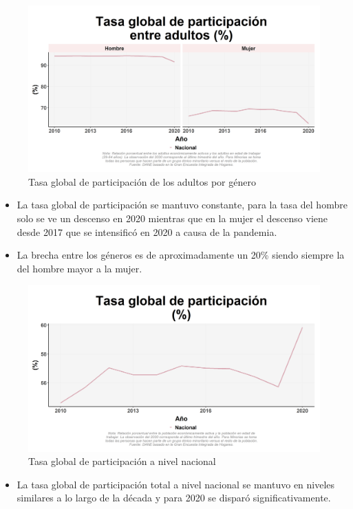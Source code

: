     \begin{figure}[H]
        \caption{Tasa global de participación de los adultos por género \label{map_result_2} }
        \begin{center}
        \includegraphics[width=\textwidth,keepaspectratio]{img/var_82_trend.png}
        \end{center}
    \end{figure}
            \begin{itemize}
                \item La tasa global de participación se mantuvo constante, para la tasa del hombre solo se ve un descenso en 2020 mientras que en la mujer el descenso viene desde 2017 que se intensificó en 2020 a causa de la pandemia.
                \item La brecha entre los géneros es de aproximadamente un 20\% siendo siempre la del hombre mayor a la mujer.
                \end{itemize}

    \begin{figure}[H]
        \caption{Tasa global de participación a nivel nacional \label{map_result_2} }
        \begin{center}
        \includegraphics[width=\textwidth,keepaspectratio]{img/var_80_trend.png}
        \end{center}
    \end{figure}
            \begin{itemize}
                \item La tasa global de participación total a nivel nacional se mantuvo en niveles similares a lo largo de la década y para 2020 se disparó significativamente.
                \end{itemize}

